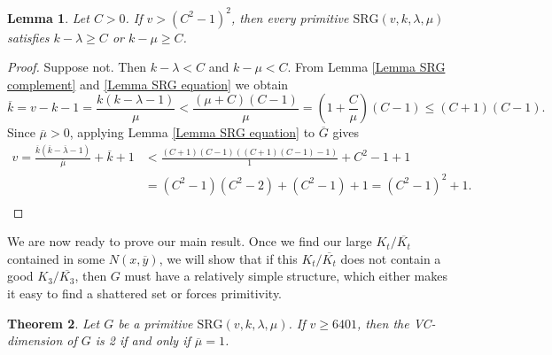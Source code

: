 \documentclass{article}
\newtheorem{thm}{Theorem}
\newtheorem{lemma}[thm]{Lemma}
\theoremstyle{definition}
\begin{document}
\begin{lemma} \label{Lemma Ramsey setup}
    Let $C>0$. If $v>(C^2-1)^2$, then every primitive $\mathrm{SRG}(v,k,\lambda,\mu)$ satisfies $k-\lambda\ge C$ or $k-\mu\ge C$.
\end{lemma}
\begin{proof}
    Suppose not. Then $k-\lambda<C$ and $k-\mu<C$. From Lemma \ref{Lemma SRG complement} and \ref{Lemma SRG equation} we obtain
    $$\overline k=v-k-1=\frac{k(k-\lambda-1)}{\mu}<\frac{(\mu+C)(C-1)}{\mu}=\left(1+\frac{C}{\mu}\right)(C-1)\le(C+1)(C-1).$$
    Since $\overline\mu>0$, applying Lemma \ref{Lemma SRG equation} to $\overline G$ gives
    $$\begin{aligned}v=\frac{\overline k(\overline k-\overline\lambda-1)}{\overline\mu}+\overline k+1&<\frac{(C+1)(C-1)((C+1)(C-1)-1)}{1}+C^2-1+1\\
    &=(C^2-1)(C^2-2)+(C^2-1)+1=(C^2-1)^2+1.\\\end{aligned}$$
\end{proof}

We are now ready to prove our main result. Once we find our large $K_t/\overline{K_t}$ contained in some $N(x,\overline y)$, we will show that if this $K_t/\overline{K_t}$ does not contain a good $K_3/\overline{K_3}$, then $G$ must have a relatively simple structure, which either makes it easy to find a shattered set or forces primitivity.

\begin{thm} \label{Theorem VC=2}
    Let $G$ be a primitive $\mathrm{SRG}(v,k,\lambda,\mu)$. If $v\ge 6401$, then the VC-dimension of $G$ is 2 if and only if $\overline\mu=1$.
\end{thm}
\end{document}
